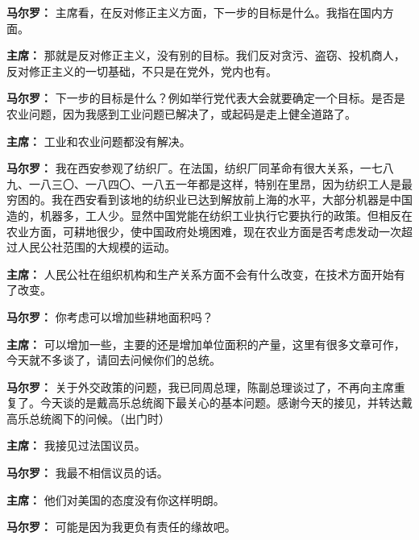 \begin{list}{}
\item[\textbf{马尔罗：}] 主席看，在反对修正主义方面，下一步的目标是什么。我指在国内方面。

\item[\textbf{主席：}] 那就是反对修正主义，没有别的目标。我们反对贪污、盗窃、投机商人，反对修正主义的一切基础，不只是在党外，党内也有。

\item[\textbf{马尔罗：}] 下一步的目标是什么？例如举行党代表大会就要确定一个目标。是否是农业问题，因为我感到工业问题已解决了，或起码是走上健全道路了。

\item[\textbf{主席：}] 工业和农业问题都没有解决。

\item[\textbf{马尔罗：}] 我在西安参观了纺织厂。在法国，纺织厂同革命有很大关系，一七八九、一八三〇、一八四〇、一八五一年都是这样，特别在里昂，因为纺织工人是最穷困的。我在西安看到该地的纺织业已达到解放前上海的水平，大部分机器是中国造的，机器多，工人少。显然中国党能在纺织工业执行它要执行的政策。但相反在农业方面，可耕地很少，使中国政府处境困难，现在农业方面是否考虑发动一次超过人民公社范围的大规模的运动。

\item[\textbf{主席：}] 人民公社在组织机构和生产关系方面不会有什么改变，在技术方面开始有了改变。

\item[\textbf{马尔罗：}] 你考虑可以增加些耕地面积吗？

\item[\textbf{主席：}] 可以增加一些，主要的还是增加单位面积的产量，这里有很多文章可作，今天就不多谈了，请回去问候你们的总统。

\item[\textbf{马尔罗：}] 关于外交政策的问题，我已同周总理，陈副总理谈过了，不再向主席重复了。今天谈的是戴高乐总统阁下最关心的基本问题。感谢今天的接见，并转达戴高乐总统阁下的问候。（出门时）

\item[\textbf{主席：}] 我接见过法国议员。

\item[\textbf{马尔罗：}] 我最不相信议员的话。

\item[\textbf{主席：}] 他们对美国的态度没有你这样明朗。

\item[\textbf{马尔罗：}] 可能是因为我更负有责任的缘故吧。
\end{list}

